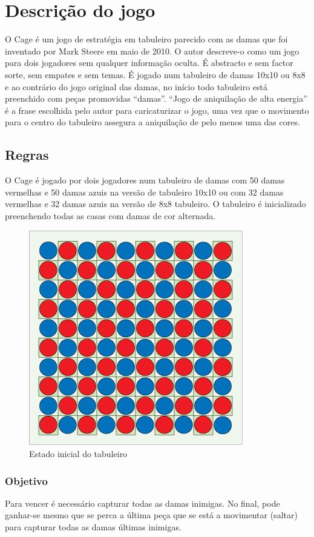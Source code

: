 \documentclass[a4paper,11pt]{article}
\begin{document}
\section{Descrição do jogo}
O Cage é um jogo de estratégia em tabuleiro parecido com as damas que foi inventado por Mark Steere em maio de 2010. O autor descreve-o como um jogo para dois jogadores sem qualquer informação oculta. É abstracto e sem factor sorte, sem empates e sem temas. É jogado num tabuleiro de damas 10x10 ou 8x8 e ao contrário do jogo original das damas, no início todo tabuleiro está preenchido com peças promovidas ``damas''. ``Jogo de aniquilação de alta energia'' é a frase escolhida pelo autor para caricaturizar o jogo, uma vez que o movimento para o centro do tabuleiro assegura a aniquilação de pelo menos uma das cores.

\subsection{Regras}
O Cage é jogado por dois jogadores num tabuleiro de damas com 50 damas vermelhas e 50 damas azuis na versão de tabuleiro 10x10 ou com 32 damas vermelhas e 32 damas azuis na versão de 8x8 tabuleiro. O tabuleiro é inicializado preenchendo todas as casas com damas de cor alternada.

\begin{figure}[H]
    \center
    \includegraphics[scale=0.7]{res/1-initial-setup.jpg}
    \caption{Estado inicial do tabuleiro}
    \label{fig:1-initial-setup.png}
\end{figure}

\subsubsection{Objetivo}
Para vencer é necessário capturar todas as damas inimigas. No final, pode ganhar-se mesmo que se perca a última peça que se está a movimentar (saltar) para capturar todas as damas últimas inimigas.
\end{document}
